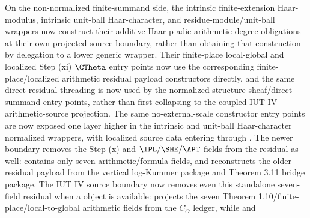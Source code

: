 \begin{proposition}
	  On the non-normalized finite-summand side, the intrinsic
	  finite-extension Haar-modulus, intrinsic unit-ball Haar-character, and
	  residue-module/unit-ball wrappers now construct their additive-Haar
	  p-adic arithmetic-degree obligations at their own projected source
	  boundary, rather than obtaining that construction by delegation to a
	  lower generic wrapper.  Their finite-place local-global and localized
	  Step (xi) \(\CTheta\) entry points now use the corresponding
	  finite-place/localized arithmetic residual payload constructors directly,
	  and the same direct residual threading is now used by the normalized
	  structure-sheaf/direct-summand entry points, rather than first collapsing
	  to the coupled IUT-IV arithmetic-source projection.
	  The same no-external-scale constructor entry points are now exposed one
	  layer higher in the intrinsic and unit-ball Haar-character normalized
	  wrappers, with localized source data entering through
	  .
		  The newer boundary removes the Step (x) and \(\IPL/\SHE/\APT\) fields from
		  the residual as well:
	  contains only seven arithmetic/formula fields, and
	  reconstructs the older residual payload from the vertical log-Kummer
	  package and Theorem 3.11 bridge package.  The IUT IV source boundary now
	  removes even this standalone seven-field residual when a
	  object is available:
	  projects the seven Theorem 1.10/finite-place/local-to-global arithmetic
	  fields from the \(C_{\Theta}\) ledger, while
	  and

\end{proposition}

